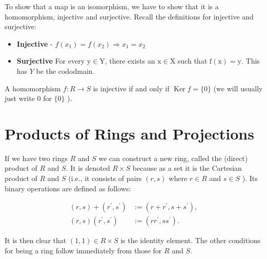 \begin{remark}
  To show that a map is an isomorphism, we have to show that it is a homomorphism, injective and surjective. Recall the definitions for injective and surjective:

\begin{itemize}
  \item \textbf{Injective} - \(f\left(x_1\right)=f\left(x_2\right) \Longrightarrow x_1=x_2\) 
  \item \textbf{Surjective} For every \(\mathrm{y} \in \mathrm{Y}\), there exists an \(\mathrm{x} \in \mathrm{X}\) such that \(\mathrm{f}(\mathrm{x})=\mathrm{y}\). This has \(Y\) be the cododmain.
\end{itemize}

\end{remark}

\begin{lemma}
A homomorphism \(f: R \rightarrow S\) is injective if and only if \(\operatorname{Ker} f=\{0\}\) (we will usually just write 0 for \(\{0\}\) ).
\end{lemma}

\begin{proofidea}
  
  
\end{proofidea}
  
\begin{formalproof}
  
\end{formalproof}

\section{Products of Rings and Projections}

\begin{definition}
  
If we have two rings \(R\) and \(S\) we can construct a new ring, called the (direct) product of \(R\) and \(S\). It is denoted \(R \times S\) because as a set it is the Cartesian product of \(R\) and \(S\) (i.e., it consists of pairs \((r, s)\) where \(r \in R\) and \(s \in S\) ). Its binary operations are defined as follows:

\[
\begin{aligned}
(r, s)+\left(r^{\prime}, s^{\prime}\right) & :=\left(r+r^{\prime}, s+s^{\prime}\right), \\
(r, s)\left(r^{\prime}, s^{\prime}\right) & :=\left(r r^{\prime}, s s^{\prime}\right) .
\end{aligned}
\]

It is then clear that \((1,1) \in R \times S\) is the identity element. The other conditions for being a ring follow immediately from those for \(R\) and \(S\).

\end{definition}
